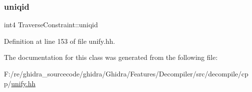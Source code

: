 \subsubsection{\texorpdfstring{uniqid}{uniqid}}
{\footnotesize\ttfamily int4 Traverse\+Constraint\+::uniqid\hspace{0.3cm}{\ttfamily [protected]}}



Definition at line 153 of file unify.\+hh.



The documentation for this class was generated from the following file\+:\begin{DoxyCompactItemize}
\item 
F\+:/re/ghidra\+\_\+sourcecode/ghidra/\+Ghidra/\+Features/\+Decompiler/src/decompile/cpp/\mbox{\hyperlink{unify_8hh}{unify.\+hh}}\end{DoxyCompactItemize}
